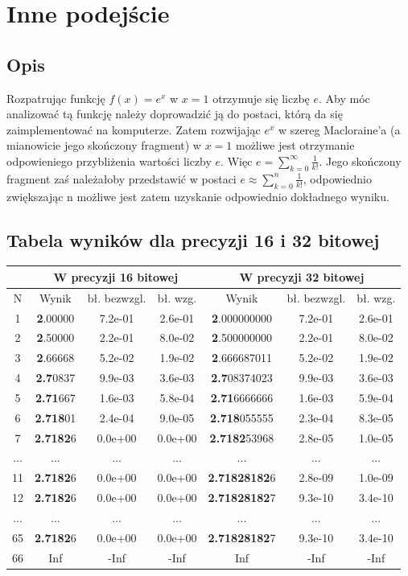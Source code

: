 \documentclass{article}
\begin{document}
\section{Inne podejście}
\subsection{Opis}
Rozpatrując funkcję $f(x)=e^x$ w $x=1$ otrzymuje się liczbę $e$. Aby móc analizować tą funkcję należy doprowadzić ją do postaci, którą da się zaimplementować na komputerze. Zatem rozwijając $e^x$ w szereg Macloraine'a (a mianowicie jego skończony fragment) w $x=1$ możliwe jest otrzymanie odpowieniego przybliżenia wartości liczby $e$. Więc $e = \sum_{k=0}^{\infty} \frac{1}{k!}$. Jego skończony fragment zaś należałoby przedstawić w postaci $e \approx \sum_{k=0}^{n} \frac{1}{k!}$, odpowiednio zwiększając n możliwe jest zatem uzyskanie odpowiednio dokładnego wyniku.
\subsection{Tabela wyników dla precyzji 16 i 32 bitowej}
\begin{tabular}{||c||c|c|c|c|c|c||} \hline
 & \multicolumn{3}{|c|}{W precyzji 16 bitowej} &\multicolumn{3}{|c|}{W precyzji 32 bitowej}  \\ \hline
N & Wynik & bł. bezwzgl. & bł. wzg. & Wynik & bł. bezwzgl. & bł. wzg.\\ \hline
1 & \textbf{2}.00000 & 7.2e-01  & 2.6e-01 & \textbf{2}.000000000 & 7.2e-01  & 2.6e-01\\
\hline
2  & \textbf{2}.50000  & 2.2e-01  & 8.0e-02 & \textbf{2}.500000000 & 2.2e-01  & 8.0e-02\\
\hline
3  & \textbf{2}.66668  & 5.2e-02  & 1.9e-02 & \textbf{2}.666687011 & 5.2e-02  & 1.9e-02\\
\hline
4  & \textbf{2.7}0837  & 9.9e-03  & 3.6e-03 & \textbf{2.7}08374023 & 9.9e-03  & 3.6e-03\\
\hline
5  & \textbf{2.71}667  & 1.6e-03  & 5.8e-04 & \textbf{2.71}6666666 & 1.6e-03  & 5.9e-04\\
\hline
6  & \textbf{2.718}01  & 2.4e-04  & 9.0e-05 & \textbf{2.718}055555 & 2.3e-04  & 8.3e-05\\
\hline
7  & \textbf{2.7182}6 & 0.0e+00  & 0.0e+00 & \textbf{2.7182}53968 & 2.8e-05  & 1.0e-05\\
\hline
... & ...  & ...  & ...& ...  & ...  & ...\\
\hline
11 & \textbf{2.7182}6 & 0.0e+00  & 0.0e+00 & \textbf{2.71828182}6  & 2.8e-09  & 1.0e-09\\
\hline
12 & \textbf{2.7182}6 & 0.0e+00  & 0.0e+00 & \textbf{2.71828182}7  & 9.3e-10  & 3.4e-10\\
\hline
... & ...  & ...  & ...& ...  & ...  & ...\\
\hline
65  & \textbf{2.7182}6 & 0.0e+00  & 0.0e+00 & \textbf{2.71828182}7  & 9.3e-10  & 3.4e-10\\
\hline
66 & Inf  & -Inf  & -Inf & Inf  & -Inf  & -Inf\\
\hline
\end{tabular}
\end{document}

